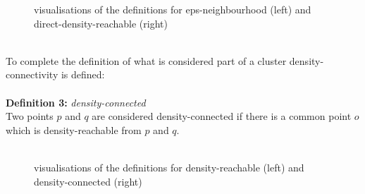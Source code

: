 \begin{figure}[H]
    \centering
    \qquad
    \caption{visualisations of the definitions for eps-neighbourhood (left) and direct-density-reachable (right)}
\end{figure}
\ \\
To complete the definition of what is considered part of a cluster density-connectivity is defined:\\
\ \\
\textbf{Definition 3:} \textit{density-connected}\\
Two points $p$ and $q$ are considered density-connected if there is a common point $o$ which is density-reachable from $p$ and $q$.\\
\ \\
\begin{figure}[H]
    \caption{visualisations of the definitions for density-reachable (left) and density-connected (right)}
\end{figure}
